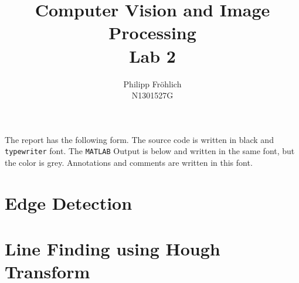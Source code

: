 \documentclass[12pt,a4paper]{scrartcl}
\author{Philipp Fröhlich\\ N1301527G}
\title{Computer Vision and Image Processing\\ Lab 2}
\begin{document}
\maketitle
\thispagestyle{empty}

The report has the following form. The source code is written in black and \texttt{typewriter} font. The \texttt{MATLAB} Output is below and written in the same font, but the color is {\color{lightgray} grey}. Annotations and comments are written in this font.
\tableofcontents
\newpage

\section{Edge Detection}


\section{Line Finding using Hough Transform}
\end{document}
